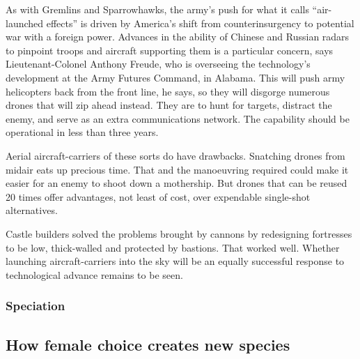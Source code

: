 \documentclass{article}
\begin{document}
As with Gremlins and Sparrowhawks, the army's push for what it calls ``air-launched effects'' is driven by America's shift from counterinsurgency to potential war with a foreign power. Advances in the ability of Chinese and Russian radars to pinpoint troops and aircraft supporting them is a particular concern, says Lieutenant-Colonel Anthony Freude, who is overseeing the technology's development at the Army Futures Command, in Alabama. This will push army helicopters back from the front line, he says, so they will disgorge numerous drones that will zip ahead instead. They are to hunt for targets, distract the enemy, and serve as an extra communications network. The capability should be operational in less than three years. 

Aerial aircraft-carriers of these sorts do have drawbacks. Snatching drones from midair eats up precious time. That and the manoeuvring required could make it easier for an enemy to shoot down a mothership. But drones that can be reused 20 times offer advantages, not least of cost, over expendable single-shot alternatives. 

Castle builders solved the problems brought by cannons by redesigning fortresses to be low, thick-walled and protected by bastions. That worked well. Whether launching aircraft-carriers into the sky will be an equally successful response to technological advance remains to be seen. {} 
\clearpage
\subsubsection{Speciation }
\subsection{How female choice creates new species }
\end{document}
